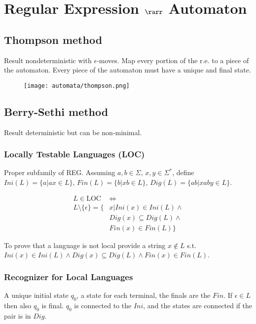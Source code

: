 \newpage
\section{Regular Expression $\rarr$ Automaton}

\subsection{Thompson method}
Result nondeterministic with $\epsilon$-moves. Map every portion of the r.e. to a piece of the automaton. Every piece of the automaton must have a unique and final state.

\begin{figure}[H]
    \centering
    \texttt{[image: automata/thompson.png]}
\end{figure}

\subsection{Berry-Sethi method}

Result deterministic but can be non-minimal.

\subsubsection{Locally Testable Languages (LOC)}

Proper subfamily of REG. Assuming $a,b \in \Sigma$, $x, y \in \Sigma^*$, define $Ini(L) = \{a | ax \in L\}$, $Fin(L) = \{b | xb \in L\}$, $Dig(L) = \{ab | xaby \in L\}$.

\begin{align*}
    L \in \text{LOC} &\iff \\
    L \setminus \{\epsilon\} = \{&x | Ini(x) \in Ini(L) \land \\
    &Dig(x) \subseteq Dig(L) \land \\
    &Fin(x) \in Fin(L) \}
\end{align*}

To prove that a language is not local provide a string $x\notin L$ s.t. $Ini(x) \in Ini(L) \land Dig(x) \subseteq Dig(L) \land Fin(x) \in Fin(L)$.

\subsubsection{Recognizer for Local Languages}

A unique initial state $q_0$, a state for each terminal, the finals are the $Fin$. If $\epsilon \in L$ then also $q_0$ is final. $q_0$ is connected to the $Ini$, and the states are connected if the pair is in $Dig$.

